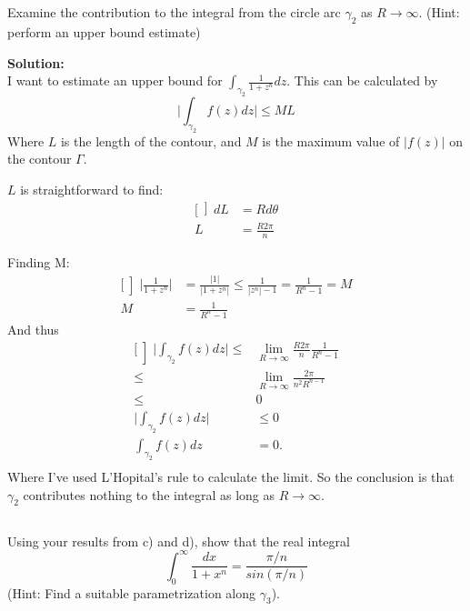 \documentclass[a4paper,12pt]{article}
\begin{document}
\subsection{}
Examine the contribution to the integral from the circle arc $\gamma_2$ as $R \rightarrow \infty$. (Hint: perform an upper bound estimate)

\textbf{Solution:}\\
I want to estimate an upper bound for $\int_{\gamma_2} \frac{1}{1+z^n}dz$.
This can be calculated by 
\begin{equation}
 \bigg|\int_{\gamma_2}f(z)dz\bigg| \le ML
\end{equation}
Where $L$ is the length of the contour, and $M$ is the maximum value of $|f(z)|$ on the contour $\Gamma$. 

$L$ is straightforward to find:
\begin{equation*}
\begin{aligned} [\left]
dL &= Rd\theta\\
 L &= \frac{R2\pi}{n}
\end{aligned}
\end{equation*}

Finding M:
\begin{equation*}
\begin{aligned}[\left]
\bigg|\frac{1}{1+z^n}\bigg| &= \frac{|1|}{|1+z^n|} \le \frac{1}{|z^n|-1} = \frac{1}{R^n-1} = M\\
M &= \frac{1}{R^n-1}
\end{aligned}
\end{equation*}
And thus
\begin{equation*}
\begin{aligned}[\left]
 \bigg|\int_{\gamma_2}f(z)dz\bigg| \le& \lim_{R\rightarrow\infty}\frac{R2\pi}{n}\frac{1}{R^n-1}\\
\le& \lim_{R\rightarrow\infty}\frac{2\pi}{n^2R^{n-1}}\\
\le& 0\\
\bigg|\int_{\gamma_2}f(z)dz\bigg| &\le 0\\
\int_{\gamma_2}f(z)dz &= 0.\\
\end{aligned}
\end{equation*}
Where I've used L'Hopital's rule to calculate the limit. So the conclusion is that $\gamma_2$ contributes nothing to the integral as long as $R \rightarrow \infty$.
\subsection{}
Using your results from c) and d), show that the real integral
\begin{equation}
 \int_0^\infty \frac{dx}{1+x^n} = \frac{\pi/n}{sin(\pi/n)}
\end{equation}
(Hint: Find a suitable parametrization along $\gamma_3$).
\end{document}
